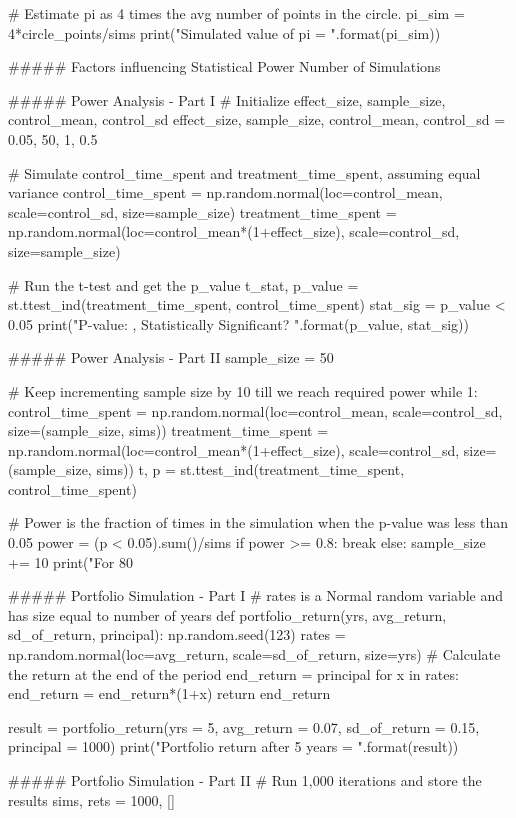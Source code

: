 # Estimate pi as 4 times the avg number of points in the circle.
pi_sim = 4*circle_points/sims
print("Simulated value of pi = {}".format(pi_sim))

##### Factors influencing Statistical Power
Number of Simulations

##### Power Analysis - Part I
# Initialize effect_size, sample_size, control_mean, control_sd
effect_size, sample_size, control_mean, control_sd = 0.05, 50, 1, 0.5

# Simulate control_time_spent and treatment_time_spent, assuming equal variance
control_time_spent = np.random.normal(loc=control_mean, scale=control_sd, size=sample_size)
treatment_time_spent = np.random.normal(loc=control_mean*(1+effect_size), scale=control_sd, size=sample_size)

# Run the t-test and get the p_value
t_stat, p_value = st.ttest_ind(treatment_time_spent, control_time_spent)
stat_sig = p_value < 0.05
print("P-value: {}, Statistically Significant? {}".format(p_value, stat_sig))

##### Power Analysis - Part II
sample_size = 50

# Keep incrementing sample size by 10 till we reach required power
while 1:
    control_time_spent = np.random.normal(loc=control_mean, scale=control_sd, size=(sample_size, sims))
    treatment_time_spent = np.random.normal(loc=control_mean*(1+effect_size), scale=control_sd, size=(sample_size, sims))
    t, p = st.ttest_ind(treatment_time_spent, control_time_spent)
    
    # Power is the fraction of times in the simulation when the p-value was less than 0.05
    power = (p < 0.05).sum()/sims
    if power >= 0.8: 
        break
    else: 
        sample_size += 10
print("For 80%

##### Portfolio Simulation - Part I
# rates is a Normal random variable and has size equal to number of years
def portfolio_return(yrs, avg_return, sd_of_return, principal):
    np.random.seed(123)
    rates = np.random.normal(loc=avg_return, scale=sd_of_return, size=yrs)
    # Calculate the return at the end of the period
    end_return = principal
    for x in rates:
        end_return = end_return*(1+x)
    return end_return

result = portfolio_return(yrs = 5, avg_return = 0.07, sd_of_return = 0.15, principal = 1000)
print("Portfolio return after 5 years = {}".format(result))

##### Portfolio Simulation - Part II
# Run 1,000 iterations and store the results
sims, rets = 1000, []


